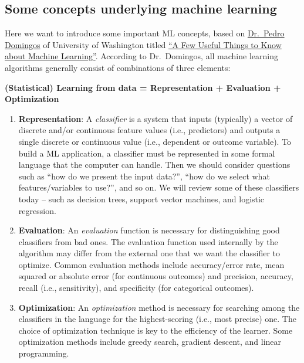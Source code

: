 \documentclass[]{book}
\begin{document}
\hypertarget{some-concepts-underlying-machine-learning}{%
\subsection{Some concepts underlying machine learning}\label{some-concepts-underlying-machine-learning}}

Here we want to introduce some important ML concepts, based on \href{https://homes.cs.washington.edu/~pedrod/}{Dr.~Pedro Domingos} of University of Washington titled \href{https://homes.cs.washington.edu/~pedrod/papers/cacm12.pdf}{``A Few Useful Things to Know about Machine Learning''}. According to Dr.~Domingos, all machine learning algorithms generally consist of combinations of three elements:

\textbf{(Statistical) Learning from data = Representation + Evaluation + Optimization}

\begin{enumerate}
\def\labelenumi{\arabic{enumi}.}
\item
  \textbf{Representation}: A \emph{classifier} is a system that inputs (typically) a vector of discrete and/or continuous feature values (i.e., predictors) and outputs a single discrete or continuous value (i.e., dependent or outcome variable). To build a ML application, a classifier must be represented in some formal language that the computer can handle. Then we should consider questions such as ``how do we present the input data?'', ``how do we select what features/variables to use?'', and so on. We will review some of these classifiers today -- such as decision trees, support vector machines, and logistic regression.
\item
  \textbf{Evaluation}: An \emph{evaluation} function is necessary for distinguishing good classifiers from bad ones. The evaluation function used internally by the algorithm may differ from the external one that we want the classifier to optimize. Common evaluation methods include accuracy/error rate, mean squared or absolute error (for continuous outcomes) and precision, accuracy, recall (i.e., sensitivity), and specificity (for categorical outcomes).
\item
  \textbf{Optimization}: An \emph{optimization} method is necessary for searching among the classifiers in the language for the highest-scoring (i.e., most precise) one. The choice of optimization technique is key to the efficiency of the learner. Some optimization methods include greedy search, gradient descent, and linear programming.
\end{enumerate}
\end{document}

